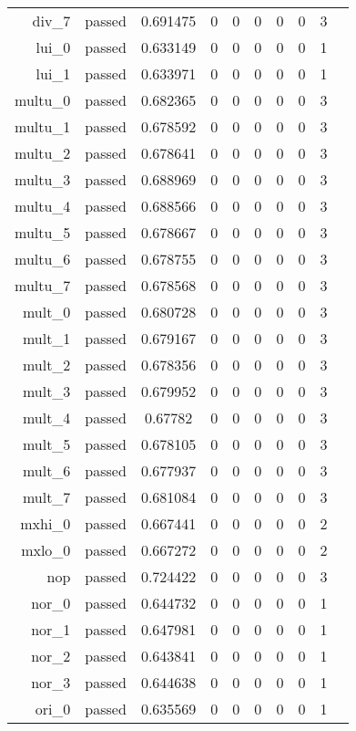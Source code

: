 \begin{longtable}{r|ccccccccc}
    div\_7 & passed & 0.691475 & 0 & 0 & 0 & 0 & 0 & 3 \\
    lui\_0 & passed & 0.633149 & 0 & 0 & 0 & 0 & 0 & 1 \\
    lui\_1 & passed & 0.633971 & 0 & 0 & 0 & 0 & 0 & 1 \\
    multu\_0 & passed & 0.682365 & 0 & 0 & 0 & 0 & 0 & 3 \\
    multu\_1 & passed & 0.678592 & 0 & 0 & 0 & 0 & 0 & 3 \\
    multu\_2 & passed & 0.678641 & 0 & 0 & 0 & 0 & 0 & 3 \\
    multu\_3 & passed & 0.688969 & 0 & 0 & 0 & 0 & 0 & 3 \\
    multu\_4 & passed & 0.688566 & 0 & 0 & 0 & 0 & 0 & 3 \\
    multu\_5 & passed & 0.678667 & 0 & 0 & 0 & 0 & 0 & 3 \\
    multu\_6 & passed & 0.678755 & 0 & 0 & 0 & 0 & 0 & 3 \\
    multu\_7 & passed & 0.678568 & 0 & 0 & 0 & 0 & 0 & 3 \\
    mult\_0 & passed & 0.680728 & 0 & 0 & 0 & 0 & 0 & 3 \\
    mult\_1 & passed & 0.679167 & 0 & 0 & 0 & 0 & 0 & 3 \\
    mult\_2 & passed & 0.678356 & 0 & 0 & 0 & 0 & 0 & 3 \\
    mult\_3 & passed & 0.679952 & 0 & 0 & 0 & 0 & 0 & 3 \\
    mult\_4 & passed & 0.67782 & 0 & 0 & 0 & 0 & 0 & 3 \\
    mult\_5 & passed & 0.678105 & 0 & 0 & 0 & 0 & 0 & 3 \\
    mult\_6 & passed & 0.677937 & 0 & 0 & 0 & 0 & 0 & 3 \\
    mult\_7 & passed & 0.681084 & 0 & 0 & 0 & 0 & 0 & 3 \\
    mxhi\_0 & passed & 0.667441 & 0 & 0 & 0 & 0 & 0 & 2 \\
    mxlo\_0 & passed & 0.667272 & 0 & 0 & 0 & 0 & 0 & 2 \\
    nop & passed & 0.724422 & 0 & 0 & 0 & 0 & 0 & 3 \\
    nor\_0 & passed & 0.644732 & 0 & 0 & 0 & 0 & 0 & 1 \\
    nor\_1 & passed & 0.647981 & 0 & 0 & 0 & 0 & 0 & 1 \\
    nor\_2 & passed & 0.643841 & 0 & 0 & 0 & 0 & 0 & 1 \\
    nor\_3 & passed & 0.644638 & 0 & 0 & 0 & 0 & 0 & 1 \\
    ori\_0 & passed & 0.635569 & 0 & 0 & 0 & 0 & 0 & 1 \\

\end{longtable}
